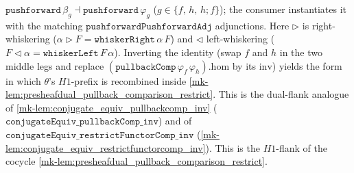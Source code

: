 \begin{lemma}
  \(\mathtt{pushforward}\,\beta_g \dashv \mathtt{pushforward}\,\varphi_g\)
  (\(g \in \{f,\, h,\, h\mathbin{;}f\}\)); the consumer instantiates it with the matching
  \(\mathtt{pushforwardPushforwardAdj}\) adjunctions. Here \(\triangleright\) is right-whiskering
  (\(\alpha \triangleright F = \mathtt{whiskerRight}\,\alpha\,F\)) and \(\triangleleft\) left-whiskering
  (\(F \triangleleft \alpha = \mathtt{whiskerLeft}\,F\,\alpha\)). Inverting the identity (swap \(f\)
  and \(h\) in the two middle legs and replace \((\mathtt{pullbackComp}\,\varphi_f\,\varphi_h).\mathrm{hom}\)
  by its \(\mathrm{inv}\)) yields the form in which \(\theta\)'s \(H1\)-prefix is recombined inside
  \ref{mk-lem:presheafdual_pullback_comparison_restrict}.
  This is the dual-flank analogue of \ref{mk-lem:conjugate_equiv_pullbackcomp_inv}
  (\(\mathtt{conjugateEquiv\_pullbackComp\_inv}\)) and of
  \(\mathtt{conjugateEquiv\_restrictFunctorComp\_inv}\)
  (\ref{mk-lem:conjugate_equiv_restrictfunctorcomp_inv}). This is the \(H1\)-flank of the cocycle
  \ref{mk-lem:presheafdual_pullback_comparison_restrict}.
\end{lemma}
